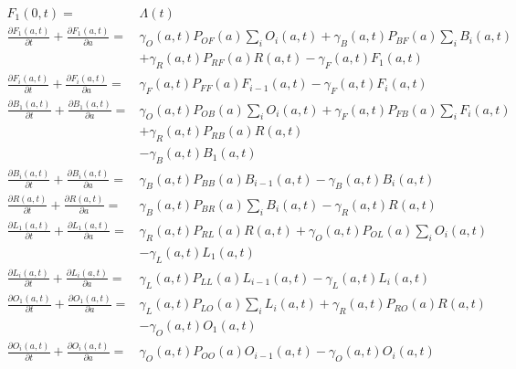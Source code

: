 \documentclass{article}
\begin{document}
\begin{equation}\begin{array}{rl}
F_1(0,t)=& \Lambda(t) \\ 
%
\frac{\partial F_1(a,t)}{\partial t} + \frac{\partial F_1(a,t)}{\partial a} =& 
\gamma_O(a,t) P_{OF}(a) \sum_i O_i(a,t) 
+ \gamma_B(a,t) P_{BF}(a)  \sum_i B_i(a,t) \\&
+ \gamma_R(a,t) P_{RF}(a) R(a,t) 
- \gamma_F(a,t) F_1(a,t) \\ 
%
\frac{\partial F_i(a,t)}{\partial t} + \frac{\partial F_i(a,t)}{\partial a} =& \gamma_F(a,t) P_{FF}(a) F_{i-1} (a,t) - \gamma_F(a,t) F_i(a,t) \\ 
%
%
\frac{\partial B_1(a,t)}{\partial t} + \frac{\partial B_1(a,t)}{\partial a} =&  
\gamma_O(a,t) P_{OB}(a) \sum_i O_i(a,t) 
+ \gamma_F(a,t) P_{FB}(a) \sum_i F_i(a,t)\\& 
+ \gamma_R(a,t) P_{RB}(a) R(a,t)
\\&
- \gamma_B(a,t) B_1(a,t) \\ 
%
\frac{\partial B_i(a,t)}{\partial t} + \frac{\partial B_i(a,t)}{\partial a} =& \gamma_B(a,t) P_{BB}(a) B_{i-1}(a,t) -
\gamma_B(a,t) B_i(a,t) 
\\
%
\frac{\partial R(a,t)}{\partial t} + \frac{\partial R(a,t)}{\partial a} =&  \gamma_B(a,t) P_{BR}(a) \sum_i B_i(a,t) - \gamma_R(a,t) R(a,t)\\ 
%
\frac{\partial L_1(a,t)}{\partial t} + \frac{\partial L_1(a,t)}{\partial a} =& \gamma_R(a,t) P_{RL}(a) R(a,t) + 
\gamma_O(a,t) P_{OL}(a) \sum_i O_i(a,t)\\& - \gamma_L(a,t) L_1(a,t)
\\ 
%
\frac{\partial L_i(a,t)}{\partial t} + \frac{\partial L_i(a,t)}{\partial a} =& \gamma_L(a,t) P_{LL}(a) L_{i-1} (a,t) - \gamma_L(a,t) L_i(a,t)
\\ 
%
\frac{\partial O_1(a,t)}{\partial t} + \frac{\partial O_1(a,t)}{\partial a} =& \gamma_L(a,t) P_{LO}(a) \sum_i L_i(a,t) 
+ \gamma_R(a,t) P_{RO}(a) R(a,t) \\&
- \gamma_O(a,t) O_1(a,t)
\\ 
%
\frac{\partial O_i(a,t)}{\partial t} + \frac{\partial O_i(a,t)}{\partial a} =& \gamma_O(a,t) P_{OO}(a) O_{i-1} (a,t)   - \gamma_O(a,t) O_i(a,t)
\\ 
%
\end{array}\end{equation}
\end{document}
